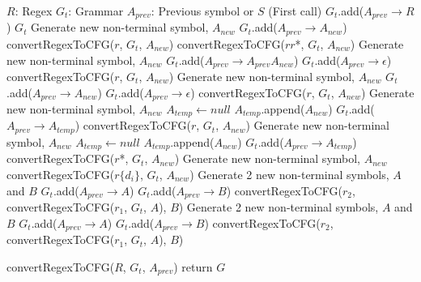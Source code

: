 \documentclass[fleqn,11pt]{article}
\begin{document}
\begin{algorithm}
\begin{algorithmic}
	\STATE $R$: Regex
	\STATE $G_t$: Grammar
	\STATE $A_{prev}$: Previous symbol or $S$ (First call)
		\STATE $G_t$.add($A_{prev} \rightarrow R$)
		\RETURN $G_t$
		\STATE Generate new non-terminal symbol, $A_{new}$
		\STATE $G_t$.add($A_{prev} \rightarrow A_{new}$)
		\RETURN convertRegexToCFG($r$, $G_t$, $A_{new}$)
		\RETURN convertRegexToCFG($rr$*, $G_t$, $A_{new}$)
		\STATE Generate new non-terminal symbol, $A_{new}$
		\STATE $G_t$.add($A_{prev} \rightarrow A_{prev} A_{new}$)
		\STATE $G_t$.add($A_{prev} \rightarrow \epsilon$)
		\RETURN convertRegexToCFG($r$, $G_t$, $A_{new}$)
		\STATE Generate new non-terminal symbol, $A_{new}$
		\STATE $G_t$.add($A_{prev} \rightarrow A_{new}$)
		\STATE $G_t$.add($A_{prev} \rightarrow \epsilon$)
		\RETURN convertRegexToCFG($r$, $G_t$, $A_{new}$)
		\STATE Generate new non-terminal symbol, $A_{new}$
		\STATE $A_{temp} \leftarrow null$
			\STATE $A_{temp}$.append($A_{new}$)
		\ENDFOR
		\STATE $G_t$.add($A_{prev} \rightarrow A_{temp}$)
		\RETURN convertRegexToCFG($r$, $G_t$, $A_{new}$)
		\STATE Generate new non-terminal symbol, $A_{new}$
		\STATE $A_{temp} \leftarrow null$
			\STATE $A_{temp}$.append($A_{new}$)
		\ENDFOR
		\STATE $G_t$.add($A_{prev} \rightarrow A_{temp}$)
		\RETURN convertRegexToCFG($r$*, $G_t$, $A_{new}$)
		\STATE Generate new non-terminal symbol, $A_{new}$
			\STATE convertRegexToCFG($r\{d_i\}$, $G_t$, $A_{new}$)
		\ENDFOR
		\STATE Generate 2 new non-terminal symbols, $A$ and $B$
		\STATE $G_t$.add($A_{prev} \rightarrow A$)
		\STATE $G_t$.add($A_{prev} \rightarrow B$)
		\RETURN convertRegexToCFG($r_2$, convertRegexToCFG($r_1$, $G_t$, $A$), $B$)
		\STATE Generate 2 new non-terminal symbols, $A$ and $B$
		\STATE $G_t$.add($A_{prev} \rightarrow A$)
		\STATE $G_t$.add($A_{prev} \rightarrow B$)
		\RETURN convertRegexToCFG($r_2$, convertRegexToCFG($r_1$, $G_t$, $A$), $B$)
	\ENDIF
\end{algorithmic}
\caption{convertRegexToCFG($R$, $G_t$, $A_{prev}$) return $G$}
\end{algorithm}
\end{document}
